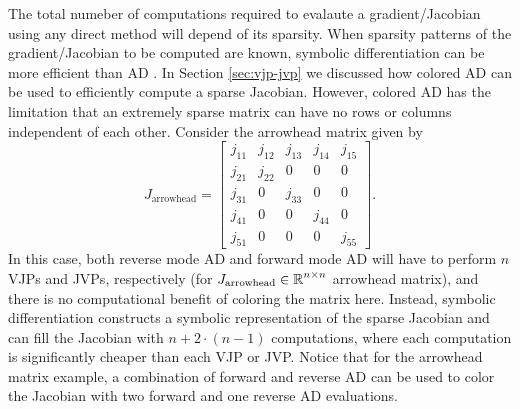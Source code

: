 The total numeber of computations required to evalaute a gradient/Jacobian using any direct method will depend of its sparsity.  
When sparsity patterns of the gradient/Jacobian to be computed are known, symbolic differentiation can be more efficient than AD \cite{Lantoine_Russell_Dargent_2012}.
In Section \ref{sec:vjp-jvp} we discussed how colored AD can be used to efficiently compute a sparse Jacobian.
However, colored AD has the limitation that an extremely sparse matrix can have no rows or columns independent of each other. 
Consider the arrowhead matrix given by
\begin{equation}
    J_{\text{arrowhead}} = \begin{bmatrix}
        j_{11} & j_{12}   & j_{13} & j_{14}     & j_{15}   \\
        j_{21} & j_{22}   &  0       & 0        & 0        \\
        j_{31} & 0        & j_{33}   & 0        & 0        \\
        j_{41} & 0        & 0        & j_{44}   & 0        \\
        j_{51} & 0        & 0        & 0        & j_{55}
    \end{bmatrix}.
\end{equation}
In this case, both reverse mode AD and forward mode AD will have to perform $n$ VJPs and JVPs, respectively (for $J_{\text{arrowhead}} \in \operatorname{\mathbb{R}}^{n \times n}$ arrowhead matrix), and there is no computational benefit of coloring the matrix here. 
Instead, symbolic differentiation constructs a symbolic representation of the sparse Jacobian and can fill the Jacobian with $n + 2 \cdot (n-1)$ computations, where each computation is significantly cheaper than each VJP or JVP. 
Notice that for the arrowhead matrix example, a combination of forward and reverse AD can be used to color the Jacobian with two forward and one reverse AD evaluations. 


